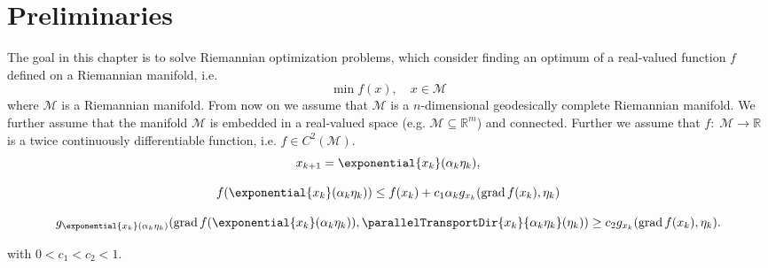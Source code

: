\section{Preliminaries}

The goal in this chapter is to solve Riemannian optimization problems, which consider finding an optimum of a real-valued function $f$ defined on a Riemannian manifold, i.e.
\begin{equation}\label{RiemannianOptimizationProblem}
    \min f(x), \quad x \in \mathcal{M}
\end{equation}
where $\mathcal{M}$ is a Riemannian manifold. From now on we assume that $\mathcal{M}$ is a $n$-dimensional geodesically complete Riemannian manifold. We further assume that the manifold $\mathcal{M}$ is embedded in a real-valued space (e.g. $\mathcal{M} \subseteq \mathbb{R}^m$) and connected. Further we assume that $f \colon \; \mathcal{M} \to \mathbb{R}$ is a twice continuously differentiable function, i.e. $f \in C^2(\mathcal{M})$. \\

\begin{equation}\label{RiemannianIterativeUpdateScheme}
    x_{k+1} = \exponential{x_k}(\alpha_k \eta_k),
\end{equation}

\begin{equation}\label{RiemannianWolfeConditions1}
    f( \exponential{x_k}(\alpha_k \eta_k)) \leq f(x_k) + c_1 \alpha_k g_{x_k} (\operatorname{grad} f(x_k), \eta_k)
\end{equation}

\begin{equation}\label{RiemannianWolfeConditions2.2}
    g_{\exponential{x_k}(\alpha_k \eta_k)} (\operatorname{grad} f(\exponential{x_k}(\alpha_k \eta_k)), \parallelTransportDir{x_k}{\alpha_k \eta_k}(\eta_k)) \geq c_2 g_{x_k} (\operatorname{grad} f(x_k), \eta_k).
\end{equation}

with $0 < c_1 < c_2 < 1$.